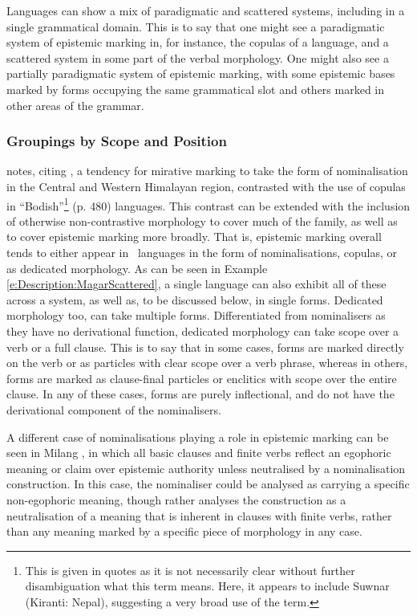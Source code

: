Languages can show a mix of paradigmatic and scattered systems, including in a single grammatical domain. This is to say that one might see a paradigmatic system of epistemic marking in, for instance, the copulas of a language, and a scattered system in some part of the verbal morphology. One might also see a partially paradigmatic system of epistemic marking, with some epistemic bases marked by forms occupying the same grammatical slot and others marked in other areas of the grammar.

\subsubsection{Groupings by Scope and Position}\label{sss:Description:ScopePosition}
 notes, citing , a tendency for mirative marking to take the form of nominalisation in the Central and Western Himalayan region, contrasted with the use of copulas in ``Bodish''\footnote{This is given in quotes as it is not necessarily clear without further disambiguation what this term means. Here, it appears to include Suwnar (Kiranti: Nepal), suggesting a very broad use of the term.} (p. 480) languages. This contrast can be extended with the inclusion of otherwise non-contrastive morphology to cover much of the family, as well as to cover epistemic marking more broadly. That is, epistemic marking overall tends to either appear in \lfam\ languages in the form of nominalisations, copulas, or as dedicated morphology. As can be seen in Example \ref{e:Description:MagarScattered}, a single language can also exhibit all of these across a system, as well as, to be discussed below, in single forms. Dedicated morphology too, can take multiple forms. Differentiated from nominalisers as they have no derivational function, dedicated morphology can take scope over a verb or a full clause. This is to say that in some cases, forms are marked directly on the verb or as particles with clear scope over a verb phrase, whereas in others, forms are marked as clause-final particles or enclitics with scope over the entire clause. In any of these cases, forms are purely inflectional, and do not have the derivational component of the nominalisers.

A different case of nominalisations playing a role in epistemic marking can be seen in Milang \cite[Siangic: India,][]{Modi2017}, in which all basic clauses and finite verbs reflect an egophoric meaning or claim over epistemic authority unless neutralised by a nominalisation construction. In this case, the nominaliser could be analysed as carrying a specific non-egophoric meaning, though  rather analyses the construction as a neutralisation of a meaning that is inherent in clauses with finite verbs, rather than any meaning marked by a specific piece of morphology in any case.

